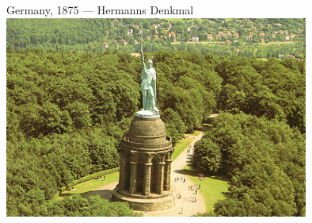 %
%
%
%

\begin{frame}{Germany, 1875 --- Hermanns Denkmal}
    \centering
    \includegraphics[width=0.75\textwidth]{img/hermans-denkmal.png} \\
\end{frame}

